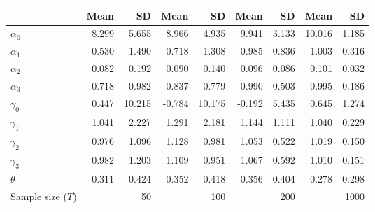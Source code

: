 
\begin{tabular}[t]{lrrrrrrrr}
\toprule
  & Mean & SD & Mean  & SD  & Mean   & SD   & Mean    & SD   \\
\midrule
$\alpha_{0}$ & 8.299 & 5.655 & 8.966 & 4.935 & 9.941 & 3.133 & 10.016 & 1.185\\
$\alpha_{1}$ & 0.530 & 1.490 & 0.718 & 1.308 & 0.985 & 0.836 & 1.003 & 0.316\\
$\alpha_{2}$ & 0.082 & 0.192 & 0.090 & 0.140 & 0.096 & 0.086 & 0.101 & 0.032\\
$\alpha_{3}$ & 0.718 & 0.982 & 0.837 & 0.779 & 0.990 & 0.503 & 0.995 & 0.186\\
$\gamma_{0}$ & 0.447 & 10.215 & -0.784 & 10.175 & -0.192 & 5.435 & 0.645 & 1.274\\
$\gamma_{1}$ & 1.041 & 2.227 & 1.291 & 2.181 & 1.144 & 1.111 & 1.040 & 0.229\\
$\gamma_{2}$ & 0.976 & 1.096 & 1.128 & 0.981 & 1.053 & 0.522 & 1.019 & 0.150\\
$\gamma_{3}$ & 0.982 & 1.203 & 1.109 & 0.951 & 1.067 & 0.592 & 1.010 & 0.151\\
$\theta$ & 0.311 & 0.424 & 0.352 & 0.418 & 0.356 & 0.404 & 0.278 & 0.298\\
Sample size ($T$) &  & 50 &  & 100 &  & 200 &  & 1000\\
\bottomrule
\end{tabular}
